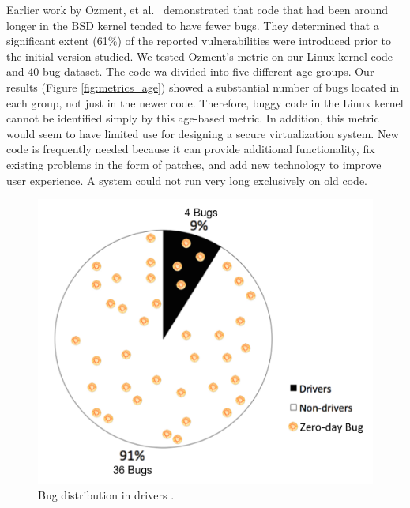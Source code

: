 Earlier work by Ozment, et al.~\cite{ozment2006milk} demonstrated that code that
had been around longer in the BSD kernel tended to have fewer bugs.
They determined that a significant extent (61\%) of the reported
vulnerabilities were
introduced prior to the initial version studied.
We tested Ozment's metric on our Linux kernel code and 40 bug dataset.
The code wa divided into five different age groups.
Our results (Figure \ref{fig:metrics_age}) showed a substantial
number of bugs located in each group, not just in the newer code.
Therefore, buggy code in the Linux kernel cannot be identified simply
by this age-based metric.
In addition, this metric would seem to have limited use for designing a secure
virtualization system. New code is frequently needed because it can provide
additional functionality,
fix existing problems in the form of patches, and add new technology to improve
user experience. A system could not run very long exclusively on old code.

\begin{figure}
\centering
\includegraphics[width=0.9\columnwidth]{diagram/metrics_drivers.png}
\caption{\small Bug distribution in drivers \cite{PittSFIeld}.}
\label{fig:metrics_drivers}
\end{figure}

